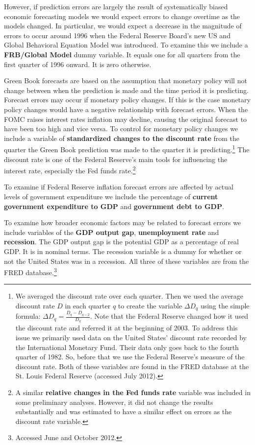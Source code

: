 \documentclass[a4paper]{article}\usepackage{graphicx, color}
\begin{document}
However, if prediction errors are largely the result of systematically biased economic forecasting models we would expect errors to change overtime as the models changed. In particular, we would expect a decrease in the magnitude of errors to occur around 1996 when the Federal Reserve Board's new US and Global Behavioral Equation Model was introduced. To examine this we include a {\bf{FRB/Global Model}} dummy variable. It equals one for all quarters from the first quarter of 1996 onward. It is zero otherwise.

Green Book forecasts are based on the assumption that monetary policy will not change between when the prediction is made and the time period it is predicting. Forecast errors may occur if monetary policy changes. If this is the case monetary policy changes would have a negative relationship with forecast errors. When the FOMC raises interest rates inflation may decline, causing the original forecast to have been too high and vice versa. To control for monetary policy changes we include a variable of {\bf{standardized changes to the discount rate}} from the quarter the Green Book prediction was made to the quarter it is predicting.\footnote{We averaged the discount rate over each quarter. Then we used the average discount rate $D$ in each quarter $q$ to create the variable $\Delta D_{q}$ using the simple formula: $\Delta D_{q} = \frac{D_{q} - D_{q-2}}{D_{q}}$. Note that the Federal Reserve changed how it used the discount rate and referred it at the beginning of 2003. To address this issue we primarily used data on the United States' discount rate recorded by the International Monetary Fund. Their data only goes back to the fourth quarter of 1982. So, before that we use the Federal Reserve's measure of the discount rate. Both of these variables are found in the FRED database at the St. Louis Federal Reserve (accessed July 2012). } The discount rate is one of the Federal Reserve's main tools for influencing the interest rate, especially the Fed funds rate.\footnote{A similar {\bf{relative changes in the Fed funds rate}} variable was included in some preliminary analyses. However, it did not change the results substantially and was estimated to have a similar effect on errors as the discount rate variable.}

To examine if Federal Reserve inflation forecast errors are affected by actual levels of government expenditure we include the percentage of {\bf{current government expenditure to GDP}} and {\bf{government debt to GDP}}. 

To examine how broader economic factors may be related to forecast errors we include variables of the {\bf{GDP output gap}}, {\bf{unemployment rate}} and {\bf{recession}}. The GDP output gap is the potential GDP as a percentage of real GDP. It is in nominal terms. The recession variable is a dummy for whether or not the United States was in a recession. All three of these variables are from the FRED database.\footnote{Accessed June and October 2012.} 
\end{document}
